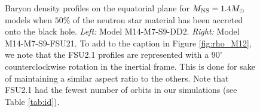 \begin{figure}
\begin{subfigure}[b]{0.475\textwidth}
		\label{fig:rho_M14_FSU21}
		\centering
	\end{subfigure}
	\caption[Density profiles on equatorial plane for $1.4 M_{\odot}$ models]{
	Baryon density profiles on the equatorial plane for $M_{\rm NS} = 1.4 M_{\odot}$ models when $50\%$ of the neutron star material has been accreted onto the black hole.
	\textit{Left:} Model M14-M7-S9-DD2.
	\textit{Right:} Model M14-M7-S9-FSU21.
	To add to the caption in Figure \ref{fig:rho_M12}, we note that the FSU2.1 profiles are represented with a $90^{\circ}$ counterclockwise rotation in the inertial frame.  This is done for sake of maintaining a similar aspect ratio to the others.  Note that FSU2.1 had the fewest number of orbits in our simulations (see Table \ref{tab:id}). 
	}
	\label{fig:rho_M14}
\end{figure}